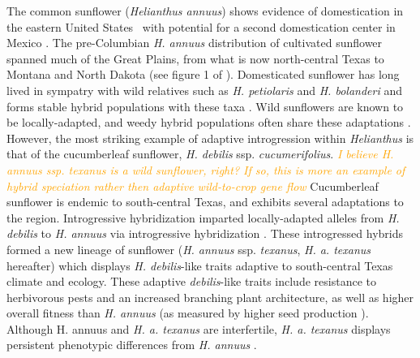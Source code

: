 \documentclass[11pt]{article}
\newcommand{\mbh}[1]{\textcolor{orange}{ \emph{\scriptsize  #1}} } %
\begin{document}
\begin{enumerate}
The common sunflower (\emph{Helianthus annuus}) shows evidence of domestication in the eastern United States \cite{harter2004origin, wills2006chloroplast}\, with potential for a second domestication center in Mexico \cite{lentz2008sunflower}.
The pre-Columbian \emph{H. annuus} distribution of cultivated sunflower spanned much of the Great Plains, from what is now north-central Texas to Montana and North Dakota (see figure 1 of \cite{whitney2010adaptive}).
Domesticated sunflower has long lived in sympatry with wild relatives such as \emph{H. petiolaris} and \emph{H. bolanderi} and forms stable hybrid populations with these taxa \cite{schwarzbach2002likely, rieseberg1988molecular, welch2002patterns}.
Wild sunflowers are known to be locally-adapted, and weedy hybrid populations often share these adaptations \cite{kane2008genetics}.
However, the most striking example of adaptive introgression within \emph{Helianthus} is that of the cucumberleaf sunflower, \emph{H. debilis} ssp. \emph{cucumerifolius}.
\mbh{I believe \emph{H. annuus} ssp. \emph{texanus} is a wild sunflower, right?  If so, this is more an example of hybrid speciation rather then adaptive wild-to-crop gene flow}
Cucumberleaf sunflower is endemic to south-central Texas, and exhibits several adaptations to the region.
Introgressive hybridization imparted locally-adapted alleles from \emph{H. debilis} to \emph{H. annuus} via introgressive hybridization \cite{heiser1951hybridization}. 
These introgressed hybrids formed a new lineage of sunflower (\emph{H. annuus} ssp. \emph{texanus}, \emph{H. a. texanus} hereafter) which displays \emph{H. debilis}-like traits adaptive to south-central Texas climate and ecology.
These adaptive \emph{debilis}-like traits include resistance to herbivorous pests and an increased branching plant architecture, as well as higher overall fitness than \emph{H. annuus} (as measured by higher seed production \cite{whitney2006adaptive}).
Although H. annuus and \emph{H. a. texanus} are interfertile, \emph{H. a. texanus} displays persistent phenotypic differences from \emph{H. annuus} \cite{rieseberg2007hybridization}.



\end{enumerate}
\end{document}
